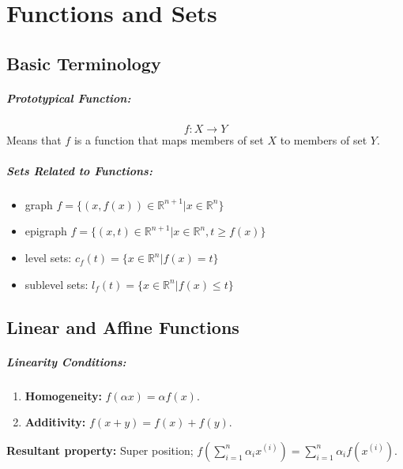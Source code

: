 \documentclass[a4paper,12pt]{report}
\def\reals{\mathbb{R}}
\begin{document}
\chapter{Functions and Sets}

\section{Basic Terminology}

\paragraph{Prototypical Function: } \begin{equation}
f:X\to Y
\end{equation}
Means that $f$ is a function that maps members of set $X$ to members of set $Y$.

\paragraph{Sets Related to Functions: } 
\begin{itemize}
\item graph $f = \{(x, f(x)) \in \reals^{n+1} | x \in \reals^n\}$
\item epigraph $f = \{(x, t) \in \reals^{n+1} | x \in \reals^n, t \geq f(x)\}$
\item level sets: $c_f(t) = \{x\in \reals^n | f(x) = t\}$
\item sublevel sets: $l_f(t) = \{x\in\reals^n | f(x) \leq t\}$
\end{itemize}

\section{Linear and Affine Functions}

\paragraph{Linearity Conditions: } 
\begin{enumerate}
\item \textbf{Homogeneity: } $f(\alpha x) = \alpha f(x)$.
\item \textbf{Additivity: } $f(x+y) = f(x) + f(y)$.
\end{enumerate}

\textbf{Resultant property: } Super position; $f(\sum_{i=1}^{n} \alpha_i x^{(i)} ) = \sum_{i=1}^{n} \alpha_i f(x^{(i)})$.
\end{document}
